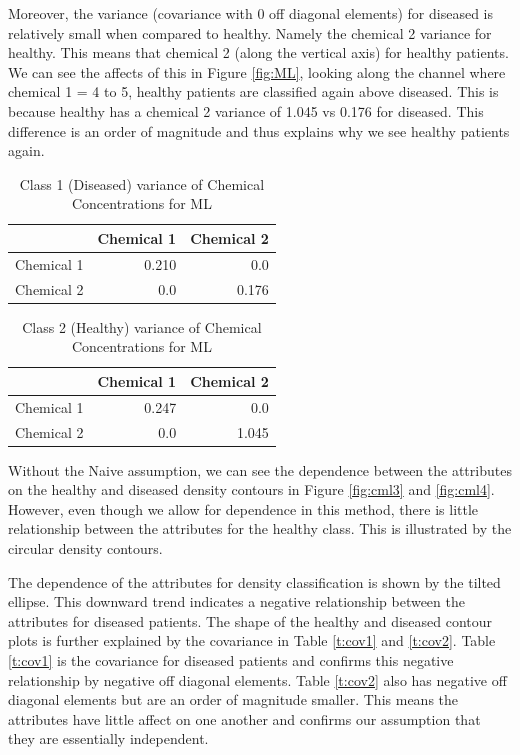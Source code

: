 {Moreover, the variance (covariance with 0 off diagonal elements) for diseased is relatively small when compared to healthy. Namely the chemical 2 variance for healthy. This means that chemical 2 (along the vertical axis) for healthy patients. We can see the affects of this in Figure \ref{fig:ML}, looking along the channel where chemical 1 = 4 to 5,  healthy patients are classified again above diseased. This is because healthy has a chemical 2 variance of 1.045 vs 0.176 for diseased. This difference is an order of magnitude and thus explains why we see healthy patients again.

\begin{table}[h!]
	\centering
	\caption{Class 1 (Diseased) variance of Chemical Concentrations for ML}
	\label{t:var1}
	\begin{tabular}{lrr}
		\hline
		\textbf{} & \textbf{Chemical 1} & \textbf{Chemical 2} \\ \hline
		Chemical 1 & 0.210 & 0.0 \\
		Chemical 2 & 0.0 & 0.176  \\
	\end{tabular}
\end{table}

\begin{table}[h!]
	\centering
	\caption{Class 2 (Healthy) variance of Chemical Concentrations for ML}
	\label{t:var2}
	\begin{tabular}{lrr}
		\hline
		\textbf{} & \textbf{Chemical 1} & \textbf{Chemical 2} \\ \hline
		Chemical 1 & 0.247 & 0.0 \\
		Chemical 2 & 0.0 & 1.045 \\
	\end{tabular}
\end{table}

Without the Naive assumption, we can see the dependence between the attributes on the healthy and diseased density contours in Figure \ref{fig:cml3} and \ref{fig:cml4}. However, even though we allow for dependence in this method, there is little relationship between the attributes for the healthy class. This is illustrated by the circular density contours.

The dependence of the attributes for density classification is shown by the tilted ellipse. This downward trend indicates a negative relationship between the attributes for diseased patients. The shape of the healthy and diseased contour plots is further explained by the covariance in Table \ref{t:cov1} and \ref{t:cov2}. Table \ref{t:cov1} is the covariance for diseased patients and confirms this negative relationship by negative off diagonal elements. Table \ref{t:cov2} also has negative off diagonal elements but are an order of magnitude smaller. This means the attributes have little affect on one another and confirms our assumption that they are essentially independent.

}
